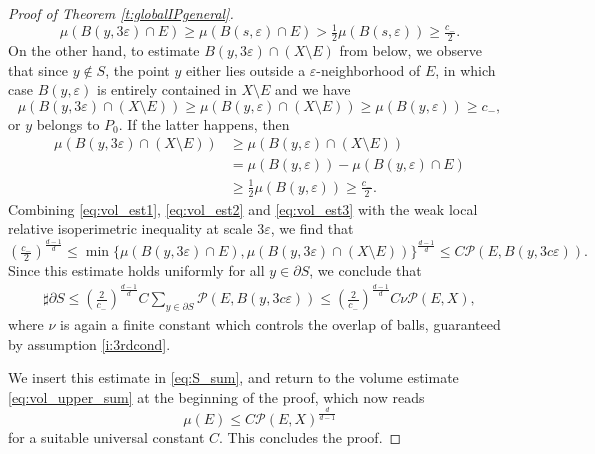 \documentclass[10pt,letterpaper]{amsart}
\theoremstyle{definition}
\numberwithin{thm}{subsection}
\numberwithin{equation}{section}
\begin{document}
\begin{proof}[Proof of Theorem \ref{t:globalIPgeneral}]
\begin{equation}
\mu(B(y,3\varepsilon) \cap E)\geq \mu(B(s,\varepsilon)\cap E)> \tfrac{1}{2}\mu(B(s,\varepsilon))\geq \tfrac{c_{-}}{2}.
\end{equation}
On the other hand, to estimate $B(y,3\varepsilon) \cap (X\setminus E)$ from below, we observe that since $y\notin S$, the point $y$ either lies outside a $\varepsilon$-neighborhood of $E$,
in which case $B(y,\varepsilon)$ is entirely contained in $X\setminus E$ and we have
\begin{equation}\label{eq:vol_est2}
\mu(B(y,3\varepsilon) \cap (X\setminus E)) \geq \mu(B(y,\varepsilon) \cap (X\setminus E))\geq \mu(B(y,\varepsilon))\geq c_{-},
\end{equation}
or $y$ belongs to $P_0$. If the latter happens, then
\begin{equation}\begin{split}\label{eq:vol_est3}
\mu(B(y,3\varepsilon) \cap (X\setminus E)) &\ge \mu(B(y,\varepsilon) \cap (X\setminus E))\\
&= \mu(B(y,\varepsilon))-\mu(B(y,\varepsilon) \cap E) \\
&\ge \tfrac{1}{2}\mu(B(y,\varepsilon))\geq \tfrac{c_{-}}{2}.
\end{split}\end{equation}
Combining \eqref{eq:vol_est1}, \eqref{eq:vol_est2} and \eqref{eq:vol_est3} with the weak local relative isoperimetric inequality at scale $3\varepsilon$, we find that
\begin{displaymath}
\left(\tfrac{c_{-}}{2}\right)^{\frac{d-1}{d}}\leq \min\{\mu(B(y,3\varepsilon)\cap E),\mu(B(y,3\varepsilon)\cap (X\setminus E))\}^{\frac{d-1}{d}}
\leq C \mathcal{P}(E,B(y,3c\varepsilon)).
\end{displaymath}
Since this estimate holds uniformly for all $y \in \partial S$, we conclude that
\begin{align*}
\sharp\partial S \leq \left(\tfrac{2}{c_{-}}\right)^{\frac{d-1}{d}} C \sum_{y\in \partial S} \mathcal{P}(E,B(y,3c\varepsilon))
\leq \left(\tfrac{2}{c_{-}}\right)^{\frac{d-1}{d}} C \nu \mathcal{P}(E,X),
\end{align*}
 where $\nu$ is again a finite constant which controls the overlap of balls, guaranteed by assumption \eqref{i:3rdcond}.

We insert this estimate in \eqref{eq:S_sum}, and return to the volume estimate \eqref{eq:vol_upper_sum} at the beginning of the proof, which now reads
\begin{displaymath}
\mu(E) \leq C \mathcal{P}(E,X)^{\frac{d}{d-1}}
\end{displaymath}
for a suitable universal constant $C$. This concludes the proof.
\end{proof}
\end{document}

